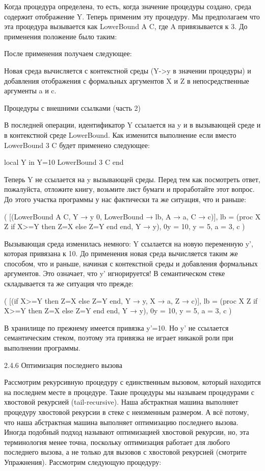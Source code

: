 Когда процедура определена, то есть, когда значение процедуры создано, среда содержит отображение Y. Теперь применим эту процедуру. Мы предполагаем что эта процедура вызывается как {LowerBound A C}, где A привязывается к 3. До применения положение было таким:

После применения получаем следующее:

Новая среда вычисляется с контекстной среды ({Y->y} в значении процедуры) и добавления отображения с формальных аргументов X и Z в непосредственные аргументы a и c.

Процедуры с внешними ссылками (часть 2)

В последней операции, идентификатор Y ссылается на y и в вызывающей среде и в контекстной среде LowerBound. Как изменится выполнение если вместо {LowerBound 3 C} будет применено следующее:

local Y in
Y=10
{LowerBound 3 C}
end

Теперь Y не ссылается на y вызывающей среды. Перед тем как посмотреть ответ, пожалуйста, отложите книгу, возьмите лист бумаги и проработайте этот вопрос. До этого участка программы у нас фактически та же ситуация, что и раньше:

( [({LowerBound A C}, {Y → y 0, LowerBound → lb, A → a, C → c})],
{ lb = (proc { X Z} if X>=Y then Z=X else Z=Y end end, {Y → y}),
0y = 10, y = 5, a = 3, c} )

Вызывающая среда изменилась немного: Y ссылается на новую переменную y', которая привязана к 10. До применения новая среда вычисляется таким же способом, что и раньше, начиная с контекстной среды и добавления формальных аргументов. Это означает, что y' игнорируется! В семантическом стеке складывается та же ситуация что прежде:

( [(if X>=Y then Z=X else Z=Y end, {Y → y, X → a, Z → c})],
{ lb = (proc { X Z} if X>=Y then Z=X else Z=Y end end, {Y → y}),
0y = 10, y = 5, a = 3, c} )

В хранилище по прежнему имеется привязка y'=10. Но y' не ссылается семантическим стеком, поэтому эта привязка не играет никакой роли при выполнении программы.

2.4.6 Оптимизация последнего вызова

Рассмотрим рекурсивную процедуру с единственным вызовом, который находится на последнем месте в процедуре. Такие процедуры мы называем процедурами с хвостовой рекурсией (tail-recursive). Наша абстрактная машина выполняет процедуру хвостовой рекурсии в стеке с неизменным размером. А всё потому, что наша абстрактная машина выполняет оптимизацию последнего вызова. Иногда подобный подход называют оптимизацией хвостовой рекурсии, но, эта терминология менее точна, поскольку оптимизация работает для любого последнего вызова, а не только для вызовов с хвостовой рекурсией (смотрите Упражнения). Рассмотрим следующую процедуру:

